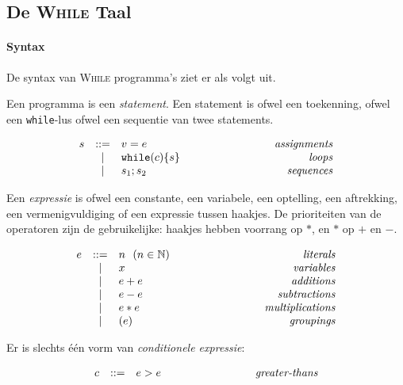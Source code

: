 \documentclass{article}
\begin{document}
\subsection{De \textsc{While} Taal}

\paragraph{Syntax}
De syntax van \textsc{While} programma's ziet er als volgt uit.

Een programma is een \textit{statement}. Een statement is ofwel
een toekenning, ofwel een \texttt{while}-lus ofwel een sequentie
van twee statements.

\[\begin{array}{rcl@{\hspace{3cm}}r}
  s & ::=  & v = e  & \textit{assignments}\\
    & \mid & \texttt{while} (c) \{ s \} & \textit{loops} \\
    & \mid & s_1 ; s_2 & \textit{sequences}
  \end{array} \]

Een \textit{expressie} is ofwel een constante, een variabele,
een optelling, een aftrekking, een vermenigvuldiging of een
expressie tussen haakjes. De prioriteiten van de operatoren
zijn de gebruikelijke: haakjes hebben voorrang op $*$, en $*$
op $+$ en $-$.

\[\begin{array}{rcl@{\hspace{3cm}}r}
  e & ::=  & n~~(n \in \mathbb{N})& \textit{literals}\\
    & \mid & x & \textit{variables} \\
    & \mid & e + e & \textit{additions} \\
    & \mid & e - e & \textit{subtractions} \\
    & \mid & e * e & \textit{multiplications} \\
    & \mid & (e)   & \textit{groupings} \\
  \end{array} \]

Er is slechts \'e\'en vorm van \textit{conditionele expressie}:

\[\begin{array}{rcl@{\hspace{3cm}}r}
  c & ::=  & e > e & \textit{greater-thans}
  \end{array} \]
\end{document}

